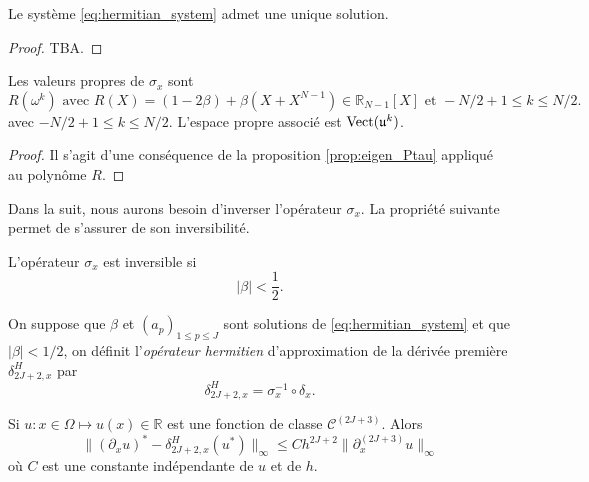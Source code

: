\begin{proposition}
Le système \eqref{eq:hermitian_system} admet une unique solution.
\end{proposition}

\begin{proof}
TBA.
\end{proof}

\begin{proposition}
Les valeurs propres de $\sigma_x$ sont
\begin{equation}
R(\omega^k) \text{ avec } R(X) = (1-2 \beta) + \beta(X+X^{N-1}) \in \mathbb{R}_{N-1}[X] \text{ et } -N/2+1 \leq k \leq N/2.
\end{equation}
avec $-N/2+1 \leq k \leq N/2$. L'espace propre associé est $\text{Vect} ( \mathfrak{u}^k )$.
\end{proposition}

\begin{proof}
Il s'agit d'une conséquence de la proposition \ref{prop:eigen_Ptau} appliqué au polynôme $R$.
\end{proof}
Dans la suit, nous aurons besoin d'inverser l'opérateur $\sigma_x$. La propriété suivante permet de s'assurer de son inversibilité.
\begin{corollaire}
L'opérateur $\sigma_x$ est inversible si
\begin{equation}
| \beta | < \dfrac{1}{2}.
\end{equation}
\end{corollaire}

\begin{definition}
On suppose que $\beta$ et $(a_p)_{1 \leq p \leq J}$ sont solutions de \eqref{eq:hermitian_system} et que $|\beta| < 1/2$, on définit l'\textit{opérateur hermitien} d'approximation de la dérivée première $\delta_{2J+2,x}^H$ par 
\begin{equation}
\delta_{2J+2,x}^H = \sigma_x^{-1} \circ \delta_{x}.
\end{equation}
\label{def:herder}
\end{definition}

\begin{theoreme}
Si $u : x \in \Omega \mapsto u(x) \in \mathbb{R}$ est une fonction de classe $\mathcal{C}^{(2J+3)}$.
Alors 
\begin{equation}
\| (\partial_x u)^* - \delta_{2J+2,x}^H (u^*) \|_{\infty} \leq C h^{2J+2} \| \partial_x^{(2J+3)} u \|_{\infty}
\end{equation}
où $C$ est une constante indépendante de $u$ et de $h$.
\label{th:consistence_herm2}
\end{theoreme}

